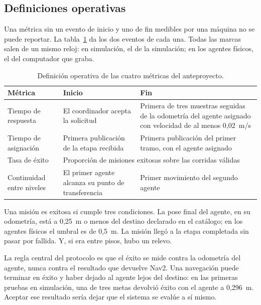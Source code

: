 \subsection{Definiciones operativas}

Una métrica sin un evento de inicio y uno de fin medibles por una máquina no se
puede reportar. La tabla~\ref{tab:metricas} da los dos eventos de cada una. Todas
las marcas salen de un mismo reloj: en simulación, el de la simulación; en los agentes físicos, el del computador que graba.

\begin{table}[htbp]
  \centering\small
  \caption{Definición operativa de las cuatro métricas del anteproyecto.}
  \label{tab:metricas}
  \begin{tabular}{@{}p{}p{}p{}@{}}
    \toprule
    \textbf{Métrica} & \textbf{Inicio} & \textbf{Fin} \\ \midrule
    Tiempo de respuesta & El coordinador acepta la solicitud & Primera de tres muestras seguidas de la odometría del agente asignado con velocidad de al menos 0,02~m/s \\ \addlinespace
    Tiempo de asignación & Primera publicación de la etapa recibida & Primera publicación del primer tramo, con el agente asignado \\ \addlinespace
    Tasa de éxito & \multicolumn{2}{p{0.72\textwidth}}{Proporción de misiones exitosas sobre las corridas válidas} \\ \addlinespace
    Continuidad entre niveles & El primer agente alcanza su punto de transferencia & Primer movimiento del segundo agente \\ \bottomrule
  \end{tabular}
\end{table}

Una misión es exitosa si cumple tres condiciones. La pose final del agente, en
su odometría, está a 0,25~m o menos del destino declarado en el catálogo; en los agentes físicos el umbral es de 0,5~m. La misión llegó a la etapa completada sin pasar
por fallida. Y, si era entre pisos, hubo un relevo.

La regla central del protocolo es que el éxito se mide contra
la odometría del agente, nunca contra el resultado que devuelve Nav2. Una
navegación puede terminar en éxito y haber dejado al agente lejos del destino:
en las primeras pruebas en simulación, una de tres metas devolvió éxito con el
agente a 0,296~m. Aceptar ese resultado sería dejar que el sistema se evalúe a
sí mismo.

